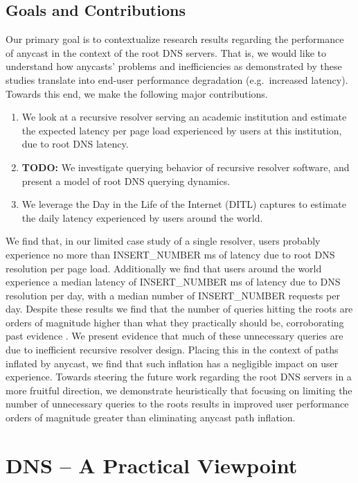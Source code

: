 \documentclass[sigconf,nonacm,10pt]{acmart}
\begin{document}
\subsection{Goals and Contributions}\label{goals-and-contributions}

Our primary goal is to contextualize research results regarding the
performance of anycast in the context of the root DNS servers. That is,
we would like to understand how anycasts' problems and inefficiencies as
demonstrated by these studies translate into end-user performance
degradation (e.g.~increased latency). Towards this end, we make the
following major contributions.

\begin{enumerate}
        \item We look at a recursive resolver serving an academic institution and estimate the expected latency per page load experienced by users at this institution, due to root DNS latency.
        \item \textbf{TODO:} We investigate querying behavior of recursive resolver software, and present a model of root DNS querying dynamics.
\item We leverage the Day in the Life of the Internet (DITL) captures to estimate the daily latency experienced by users around the world.
\end{enumerate}

We find that, in our limited case study of a single resolver, users
probably experience no more than INSERT\_NUMBER ms of latency due to
root DNS resolution per page load. Additionally we find that users
around the world experience a median latency of INSERT\_NUMBER ms of
latency due to DNS resolution per day, with a median number of
INSERT\_NUMBER requests per day. Despite these results we find that the
number of queries hitting the roots are orders of magnitude higher than
what they practically should be, corroborating past evidence \cite{}. We
present evidence that much of these unnecessary queries are due to
inefficient recursive resolver design. \break \break
Placing this in the context of paths inflated by anycast, we find that
such inflation has a negligible impact on user experience. Towards
steering the future work regarding the root DNS servers in a more
fruitful direction, we demonstrate heuristically that focusing on
limiting the number of unnecessary queries to the roots results in
improved user performance orders of magnitude greater than eliminating
anycast path inflation.

\section{DNS -- A Practical
Viewpoint}\label{dns-a-practical-viewpoint-1}
\end{document}
